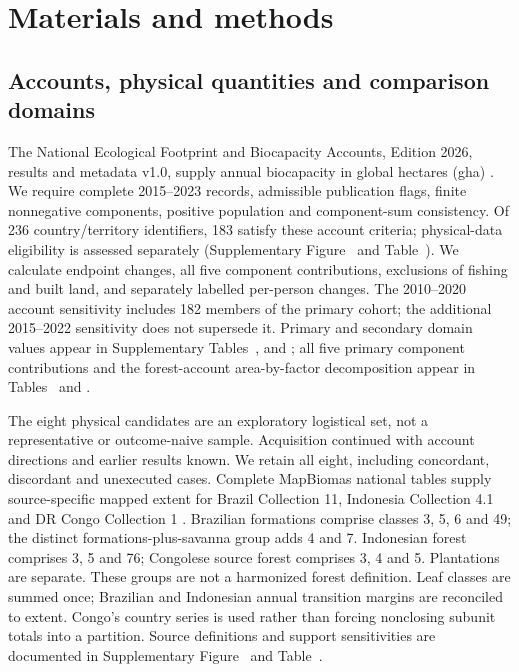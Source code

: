 \documentclass[11pt,a4paper]{article}
\begin{document}
\section{Materials and methods}
\subsection{Accounts, physical quantities and comparison domains}
The National Ecological Footprint and Biocapacity Accounts, Edition 2026, results and metadata v1.0, supply annual biocapacity in global hectares (gha) \citep{Lo2026}. We require complete 2015--2023 records, admissible publication flags, finite nonnegative components, positive population and component-sum consistency. Of 236 country/territory identifiers, 183 satisfy these account criteria; physical-data eligibility is assessed separately (Supplementary Figure~ and Table~). We calculate endpoint changes, all five component contributions, exclusions of fishing and built land, and separately labelled per-person changes. The 2010--2020 account sensitivity includes 182 members of the primary cohort; the additional 2015--2022 sensitivity does not supersede it. Primary and secondary domain values appear in Supplementary Tables~,  and ; all five primary component contributions and the forest-account area-by-factor decomposition appear in Tables~ and .

The eight physical candidates are an exploratory logistical set, not a representative or outcome-naive sample. Acquisition continued with account directions and earlier results known. We retain all eight, including concordant, discordant and unexecuted cases. Complete MapBiomas national tables supply source-specific mapped extent for Brazil Collection 11, Indonesia Collection 4.1 and DR Congo Collection 1 \citep{MapBiomas2026,MapBiomasIDN2026,MapBiomasCOD2026}. Brazilian formations comprise classes 3, 5, 6 and 49; the distinct formations-plus-savanna group adds 4 and 7. Indonesian forest comprises 3, 5 and 76; Congolese source forest comprises 3, 4 and 5. Plantations are separate. These groups are not a harmonized forest definition. Leaf classes are summed once; Brazilian and Indonesian annual transition margins are reconciled to extent. Congo's country series is used rather than forcing nonclosing subunit totals into a partition. Source definitions and support sensitivities are documented in Supplementary Figure~ and Table~.
\end{document}
